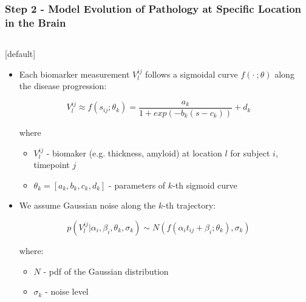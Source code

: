 \begin{frame}
\frametitle{Step 2 - Model Evolution of Pathology at Specific Location in the Brain}
\begin{columns}[T]
    \begin{column}{.7\textwidth}
    

    [default]
     \begin{itemize}
  
      \item Each biomarker measurement $V_l^{ij}$ follows a sigmoidal curve $f(\cdot\ ;\theta)$ along the disease progression:
      
      $$ V_l^{ij} \approx f(s_{ij};\theta_k) = \frac{a_k}{1+exp(-b_k(s-c_k))} + d_k $$
      
      where
      \begin{itemize}
      \item  $V_l^{ij}$ - biomaker (e.g. thickness, amyloid) at location $l$ for subject $i$, timepoint $j$
       \item $\theta_k = [a_k, b_k, c_k, d_k]$ - parameters of $k$-th sigmoid curve
      \end{itemize}
      
      \vspace{2em}
      
      \item We assume Gaussian noise along the $k$-th trajectory:

      $$p(V_l^{ij} | \alpha_i, \beta_i, \theta_k, \sigma_k) \sim N(f(\alpha_i t_{ij} + \beta_i ; \theta_k), \sigma_k)$$
            
      where:
      \begin{itemize}
       \item $N$ - pdf of the Gaussian distribution
       \item $\sigma_k$ - noise level
       
      \end{itemize}
            
     \end{itemize}
     

    \end{column}
    \hspace{-2em}
    \begin{column}{.25\textwidth}
    

\end{column}
\end{columns}
\end{frame}
